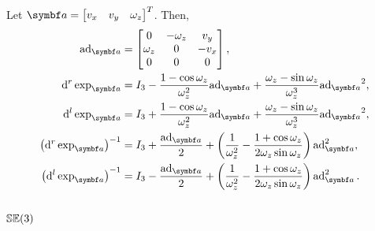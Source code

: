 \begin{properties}[title={Lowercase adjoint and exponential derivatives on $\SEtwo$}]
  Let $\a =\begin{bmatrix} v_x & v_y & \omega_z \end{bmatrix}^T$. Then,
  \begin{align}
    \ad_\a                                     & =  \begin{bmatrix}  0 & -\omega_z & v_y \\ \omega_z & 0 & -v_x \\ 0 & 0 & 0 \end{bmatrix},                                                                                                     \\
    \mathrm{d}^r \exp_{\a}                     & =        I_3 - \frac{1 - \cos \omega_z}{\omega_z^2} {\ad_\a} + \frac{ \omega_z - \sin \omega_z }{\omega_z^3} {\ad_\a}^2,         \\
    \mathrm{d}^l \exp_{\a}                     & = I_3 + \frac{1 - \cos \omega_z}{\omega_z^2} {\ad_\a} + \frac{ \omega_z - \sin \omega_z }{\omega_z^3} {\ad_\a}^2,                \\
    \left( \mathrm{d}^r \exp_{\a} \right)^{-1} & = I_3 + \frac{\ad_\a}{2} + \left( \frac{1}{\omega_z^2} - \frac{1 + \cos \omega_z }{2 \omega_z \sin \omega_z} \right) \ad_\a^2, \\
    \left( \mathrm{d}^l \exp_{\a} \right)^{-1} & = I_3 - \frac{\ad_\a}{2} + \left( \frac{1}{\omega_z^2} - \frac{1 + \cos \omega_z }{2 \omega_z \sin \omega_z} \right) \ad_\a^2.
  \end{align}
\end{properties}

\subsection{\texorpdfstring{${\mathbb{SE}(3)}$}{SE(3)}}

